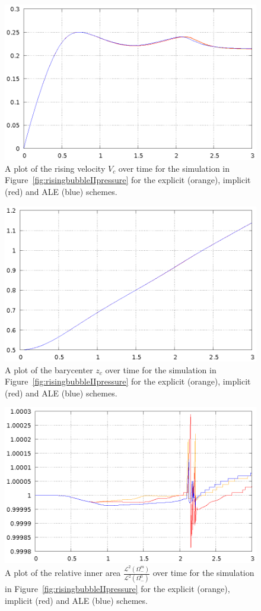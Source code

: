 \documentclass[a4paper,12pt,onecolumn]{article}
\begin{document}
\begin{figure}[htbp]
\centering
\includegraphics[width=.45\textwidth]
{figures/rising_bubble_II_rising_velocity.ps}
\caption{A plot of the rising velocity $V_c$ over time for the simulation in
Figure~\ref{fig:risingbubbleIIpressure} for the explicit (orange), implicit
(red) and ALE (blue) schemes.}
\label{fig:risingbubbleIIrisingvelocity}
\end{figure}%
\begin{figure}[htbp]
\centering
\includegraphics[width=.45\textwidth]
{figures/rising_bubble_II_barycenter.ps}
\caption{A plot of the barycenter $z_c$ over time for the simulation in
Figure~\ref{fig:risingbubbleIIpressure} for the explicit (orange), implicit
(red) and ALE (blue) schemes.}
\label{fig:risingbubbleIIbarycenter}
\end{figure}%
\begin{figure}[htbp]
\centering
\includegraphics[width=.45\textwidth]
{figures/rising_bubble_II_inner_volume.ps}
\caption{A plot of the relative inner area
$\frac{\mathcal{L}^2(\Omega^m_-)}{\mathcal{L}^2(\Omega^0_-)}$ over time for the
simulation in Figure~\ref{fig:risingbubbleIIpressure} for the explicit
(orange), implicit (red) and ALE (blue) schemes.}
\label{fig:risingbubbleIIinnervolume}
\end{figure}%
\end{document}
